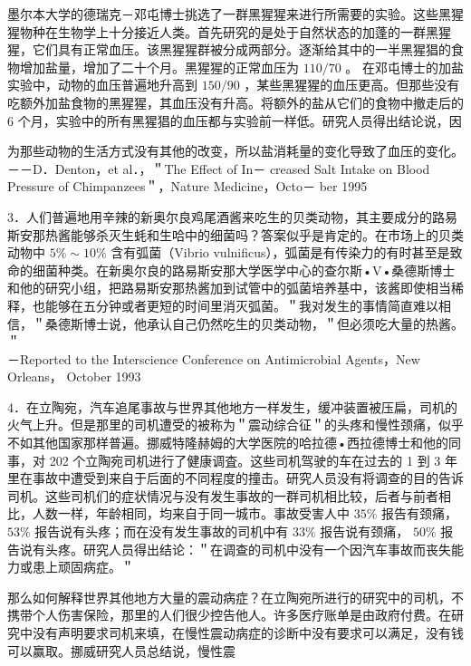 墨尔本大学的德瑞克－邓屯博士挑选了一群黑猩猩来进行所需要的实验。这些黑猩猩物种在生物学上十分接近人类。首先研究的是处于自然状态的加蓬的一群黑猩猩，它们具有正常血压。该黑猩猩群被分成两部分。逐渐给其中的一半黑猩猖的食物增加盐量，增加了二十个月。黑猩猩的正常血压为 $110 / 70$ 。 在邓屯博士的加盐实验中，动物的血压普遍地升高到 $150 / 90$ ，某些黑猩猩的血压更高。但那些没有吃额外加盐食物的黑猩猩，其血压没有升高。将额外的盐从它们的食物中撤走后的 6 个月，实验中的所有黑猩猖的血压都与实验前一样低。研究人员得出结论说，因

为那些动物的生活方式没有其他的改变，所以盐消耗量的变化导致了血压的变化。\\
－－D．Denton，et al．，＂The Effect of In－ creased Salt Intake on Blood Pressure of Chimpanzees＂，Nature Medicine，Octo－ ber 1995

3．人们普遍地用辛辣的新奥尔良鸡尾酒酱来吃生的贝类动物，其主要成分的路易斯安那热酱能够杀灭生蚝和生哈中的细菌吗？答案似乎是肯定的。在市场上的贝类动物中 $5 \% \sim 10 \%$ 含有弧菌（Vibrio vulnificus），弧菌是有传染力的有时甚至是致命的细菌种类。在新奥尔良的路易斯安那大学医学中心的查尔斯•V•桑德斯博士和他的研究小组，把路易斯安那热酱加到试管中的弧菌培养基中，该酱即使相当稀释，也能够在五分钟或者更短的时间里消灭弧菌。＂我对发生的事情简直难以相信，＂桑德斯博士说，他承认自己仍然吃生的贝类动物，＂但必须吃大量的热酱。＂\\
－Reported to the Interscience Conference on Antimicrobial Agents，New Orleans， October 1993

4．在立陶宛，汽车追尾事故与世界其他地方一样发生，缓冲装置被压扁，司机的火气上升。但是那里的司机遭受的被称为＂震动综合征＂的头疼和慢性颈痛，似乎不如其他国家那样普遍。挪威特隆赫姆的大学医院的哈拉德•西拉德博士和他的同事，对 202 个立陶宛司机进行了健康调査。这些司机驾驶的车在过去的 1 到 3 年里在事故中遭受到来自于后面的不同程度的撞击。研究人员没有将调查的目的告诉司机。这些司机们的症状情况与没有发生事故的一群司机相比较，后者与前者相比，人数一样，年龄相同，均来自于同一城市。事故受害人中 $35 \%$ 报告有颈痛， $53 \%$ 报告说有头疼；而在没有发生事故的司机中有 $33 \%$ 报告说有颈痛， $50 \%$ 报告说有头疼。研究人员得出结论：＂在调查的司机中没有一个因汽车事故而丧失能力或患上顽固病症。＂

那么如何解释世界其他地方大量的震动病症？在立陶宛所进行的研究中的司机，不携带个人伤害保险，那里的人们很少控告他人。许多医疗账单是由政府付费。在研究中没有声明要求司机来填，在慢性震动病症的诊断中没有要求可以满足，没有钱可以赢取。挪威研究人员总结说，慢性震

